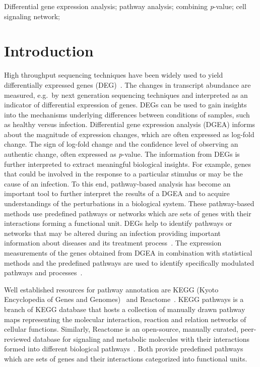 \documentclass[10pt,a4paper,twocolumn]{article}
\begin{document}
	Differential gene expression analysis; pathway analysis; combining \textit{p}-value; cell signaling network;
	
	\clearpage
	
	\section*{Introduction}
	
	High throughput sequencing techniques have been widely used to yield
	differentially expressed genes (DEG)~\cite{DEG}. The changes in
	transcript abundance are measured, e.g.~by next generation sequencing
	techniques and interpreted as an indicator of differential expression of
	genes. DEGs can be used to gain insights into the mechanisms underlying differences between conditions of samples, such as healthy versus infection. Differential gene expression analysis (DGEA) informs about the
	magnitude of expression changes, which are often
	expressed as log-fold change. The sign of log-fold change and the confidence level of
	observing an authentic change, often expressed as \textit{p}-value. The information from DEGs is further interpreted to extract meaningful biological
	insights. For example, genes that could be involved in the response to a
	particular stimulus or may be the cause of an infection. To this end, pathway-based analysis has become an important tool to further interpret
	the results of a DGEA and to acquire understandings of the perturbations in
	a biological system. These pathway-based methods use predefined pathways or
	networks which are sets of genes with their
	interactions forming a functional unit. DEGs help to identify pathways or
	networks that may be altered during an infection providing
	important information about diseases and its treatment
	process~\cite{Khatri2012}. The
	expression measurements of the genes obtained from DGEA in combination with
	statistical methods and the predefined pathways are used to identify specifically modulated
	pathways and processes~\cite{Campos}. 
	
	
	Well established resources for pathway annotation are KEGG (Kyoto
	Encyclopedia of Genes and Genomes)~\cite{Kegg} and Reactome~\cite{Reactome}. KEGG pathways is a branch of KEGG database that
	hosts a collection of manually drawn pathway maps representing the
	molecular interaction, reaction and relation networks of cellular
	functions. Similarly, Reactome is an open-source, manually curated,
	peer-reviewed database for signaling and metabolic molecules with their
	interactions formed into different biological pathways~\cite{Reactome}. Both provide predefined pathways which are sets of
	genes and their interactions categorized into functional units.
	
\end{document}
